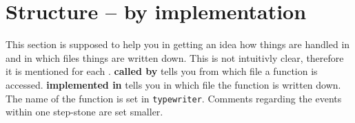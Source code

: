 \section{Structure --  by implementation}
 \label{implementation}
This section is supposed to help you in getting an idea how things are handled in \Dumux and in which files things are written down. This is not intuitivly clear, therefore it is mentioned for each . \textbf{called by} tells you from which file a function is accessed. \textbf{implemented in} tells you in which file the function is written down. The name of the function is set in \verb+typewriter+. Comments regarding the events within one step-stone are set \scriptsize{smaller}.


\begin{landscape}
{\small


}
\end{landscape}
